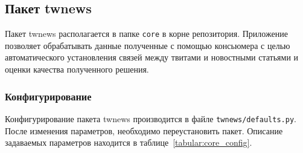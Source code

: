 \subsection{Пакет twnews}
    Пакет twnews располагается в папке \lstinline{core} в корне репозитория.
    Приложение позволяет обрабатывать данные полученные с помощью консьюмера с целью автоматического установления связей
    между твитами и новостными статьями и оценки качества полученного решения.

    \subsubsection{Конфигурирование}
        Конфигурирование пакета twnews производится в файле \lstinline{twnews/defaults.py}.
        После изменения параметров, необходимо переустановить пакет.
        Описание задаваемых параметров находится в таблице~\ref{tabular:core_config}.
